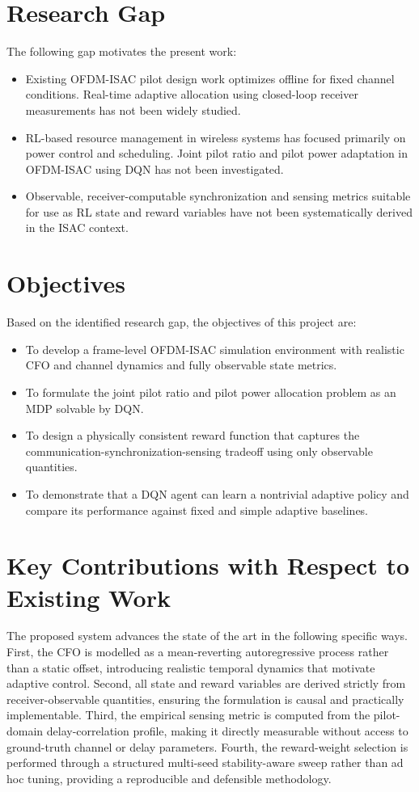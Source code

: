 \section{Research Gap}

The following gap motivates the present work:
\begin{itemize}
    \item Existing OFDM-ISAC pilot design work optimizes offline for fixed channel conditions. Real-time adaptive allocation using closed-loop receiver measurements has not been widely studied.
    \item RL-based resource management in wireless systems has focused primarily on power control and scheduling. Joint pilot ratio and pilot power adaptation in OFDM-ISAC using DQN has not been investigated.
    \item Observable, receiver-computable synchronization and sensing metrics suitable for use as RL state and reward variables have not been systematically derived in the ISAC context.
\end{itemize}

\section{Objectives}

Based on the identified research gap, the objectives of this project are:
\begin{itemize}
    \item To develop a frame-level OFDM-ISAC simulation environment with realistic CFO and channel dynamics and fully observable state metrics.
    \item To formulate the joint pilot ratio and pilot power allocation problem as an MDP solvable by DQN.
    \item To design a physically consistent reward function that captures the communication-synchronization-sensing tradeoff using only observable quantities.
    \item To demonstrate that a DQN agent can learn a nontrivial adaptive policy and compare its performance against fixed and simple adaptive baselines.
\end{itemize}

\section{Key Contributions with Respect to Existing Work}

The proposed system advances the state of the art in the following specific ways. First, the CFO is modelled as a mean-reverting autoregressive process rather than a static offset, introducing realistic temporal dynamics that motivate adaptive control. Second, all state and reward variables are derived strictly from receiver-observable quantities, ensuring the formulation is causal and practically implementable. Third, the empirical sensing metric is computed from the pilot-domain delay-correlation profile, making it directly measurable without access to ground-truth channel or delay parameters. Fourth, the reward-weight selection is performed through a structured multi-seed stability-aware sweep rather than ad hoc tuning, providing a reproducible and defensible methodology.
